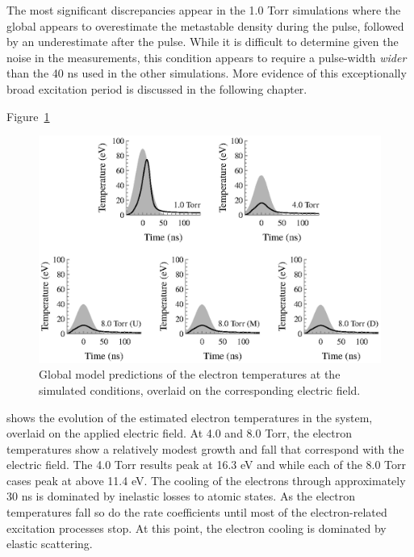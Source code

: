 The most significant discrepancies appear in the 1.0 Torr simulations where the
global appears to overestimate the metastable density during the pulse, followed
by an underestimate after the pulse. While it is difficult to determine given
the noise in the measurements, this condition appears to require a pulse-width
\emph{wider} than the 40 ns used in the other simulations. More evidence of this
exceptionally broad excitation period is discussed in the following chapter.

Figure~\ref{fig:etemps}
\begin{figure}
  \centering
  \includegraphics{./chapters/modeling/figures/etemps.eps}
  \caption{Global model predictions of the electron temperatures at the
  simulated conditions, overlaid on the corresponding electric field.}
  \label{fig:etemps}
\end{figure}
shows the evolution of the estimated electron temperatures in the system,
overlaid on the applied electric field. At 4.0 and 8.0 Torr, the electron
temperatures show a relatively modest growth and fall that correspond with the
electric field. The 4.0 Torr results peak at 16.3 eV and while each of the 8.0
Torr cases peak at above 11.4 eV. The cooling of the electrons through
approximately 30 ns is dominated by inelastic losses to atomic states. As the
electron temperatures fall so do the rate coefficients until most of the
electron-related excitation processes stop. At this point, the electron cooling
is dominated by elastic scattering.

